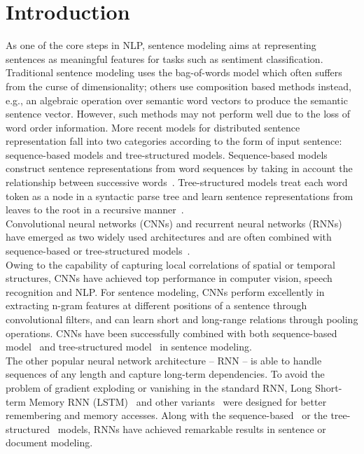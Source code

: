 \documentclass[11pt,letterpaper]{article}
\begin{document}
\section{Introduction}
As one of the core steps in NLP, sentence modeling aims at representing
sentences as meaningful features for tasks such as sentiment classification.
Traditional sentence modeling uses the bag-of-words model
which often suffers from the curse of dimensionality; others use composition
based methods instead, e.g., an algebraic operation over semantic word vectors
to produce the semantic sentence vector. However, such methods may not
perform well due to the loss of word order information.
More recent models for distributed sentence representation fall into two
categories according to the form of input sentence: sequence-based
models and tree-structured models.
Sequence-based models construct sentence representations from word
sequences by taking in account the relationship between successive
words~\cite{effective}.
Tree-structured models treat each word token as a node in a syntactic parse tree and learn sentence
representations from leaves to the root in a recursive
manner~\cite{socher2013}.\\
\indent Convolutional neural networks (CNNs) and recurrent neural
networks (RNNs) have emerged as two widely used architectures and are
often combined with sequence-based or tree-structured
models~\cite{tai2015,tao,tang,kim,dcnn,mou}.\\
\indent Owing to the capability of capturing local correlations of
spatial or temporal structures, CNNs have achieved top performance in
computer vision, speech recognition and NLP.
For sentence modeling, CNNs perform excellently in extracting n-gram
features at different positions of a sentence through convolutional
filters, and can learn short and long-range relations through pooling
operations.
CNNs have been successfully combined with both sequence-based
model~\cite{modelling,dcnn} and tree-structured model~\cite{mou} in
sentence modeling.\\
\indent The other popular neural network architecture -- RNN -- is able
to handle sequences of any length and capture long-term dependencies.
To avoid the problem of gradient exploding or vanishing in the standard
RNN, Long Short-term Memory RNN (LSTM)~\cite{lstm} and other
variants~\cite{gru} were designed for better remembering and
memory accesses.
Along with the sequence-based~\cite{tang} or the
tree-structured~\cite{tai2015} models, RNNs have achieved remarkable
results in sentence or document modeling.\\
\end{document}
